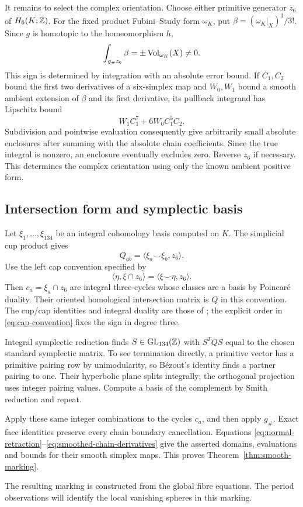 It remains to select the complex orientation. Choose either primitive
generator $z_6$ of $H_6(K;\mathbb Z)$. For the fixed product Fubini--Study
form $\omega_K$, put $\beta=(\omega_K|_X)^3/3!$. Since $g$ is
homotopic to the homeomorphism $h$,
\[
                    \int_{g_\#z_6}\beta=\pm\operatorname{Vol}_{\omega_K}(X)\ne0.
\]
This sign is determined by integration with an absolute error bound.
If $C_1,C_2$ bound the first two derivatives of a six-simplex map
and $W_0,W_1$ bound a smooth ambient extension of $\beta$ and
its first derivative, its pullback integrand has Lipschitz bound
\begin{equation}\label{eq:orientation-quadrature}
                    W_1C_1^7+6W_0C_1^5C_2.
\end{equation}
Subdivision and pointwise evaluation consequently give arbitrarily
small absolute enclosures after summing with the absolute chain
coefficients. Since the true integral is nonzero, an enclosure
eventually excludes zero. Reverse $z_6$ if necessary. This determines
the complex orientation using only the known ambient positive form.

\subsection{Intersection form and symplectic basis}

Let $\xi_1,\ldots,\xi_{134}$ be an integral cohomology basis
computed on $K$. The simplicial cup product gives
\[
             Q_{ab}=\langle\xi_a\smile\xi_b,z_6\rangle.
\]
Use the left cap convention specified by
\begin{equation}\label{eq:cap-convention}
 \langle\eta,\xi\cap z_6\rangle
                     =\langle\xi\smile\eta,z_6\rangle.
\end{equation}
Then $c_a=\xi_a\cap z_6$ are integral three-cycles whose classes
are a basis by Poincar\'e duality. Their oriented homological
intersection matrix is $Q$ in this convention. The cup/cap identities
and integral duality are those of
\cite[Theorem~3.30 and Proposition~3.38]{Hatcher}; the explicit
order in \eqref{eq:cap-convention} fixes the sign in degree three.

Integral symplectic reduction finds $S\in\operatorname{GL}_{134}(\mathbb Z)$
with $S^TQS$ equal to the chosen standard symplectic matrix. To see
termination directly, a primitive vector has a primitive pairing row
by unimodularity, so B\'ezout's identity finds a partner pairing to
one. Their hyperbolic plane splits integrally; the orthogonal
projection uses integer pairing values. Compute a basis of the
complement by Smith reduction and repeat.

Apply these same integer combinations to the cycles $c_a$, and then
apply $g_\#$. Exact face identities preserve every chain boundary
cancellation. Equations \eqref{eq:normal-retraction}--\eqref{eq:smoothed-chain-derivatives}
give the asserted domains, evaluations and bounds for their smooth
simplex maps. This proves Theorem~\ref{thm:smooth-marking}.

The resulting marking is constructed from the global fibre equations.
The period observations will identify the local vanishing spheres
in this marking.
